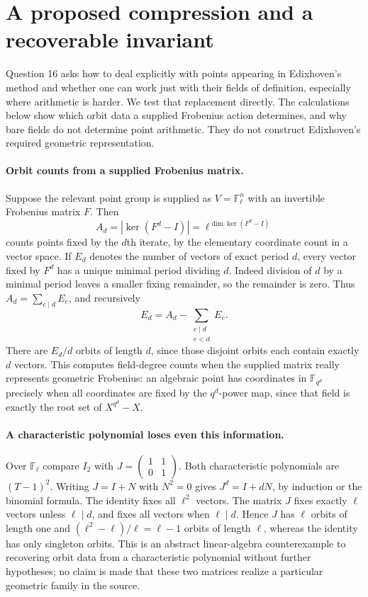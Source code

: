 \documentclass[11pt]{article}
\begin{document}
\section{A proposed compression and a recoverable invariant}
Question 16 asks how to deal explicitly with points appearing in
Edixhoven's method and whether one can work just with their fields
of definition, especially where arithmetic is harder. We test that
replacement directly. The calculations below show which orbit data
a supplied Frobenius action determines, and why bare fields do not
determine point arithmetic. They do not construct Edixhoven's required
geometric representation.

\paragraph{Orbit counts from a supplied Frobenius matrix.}
Suppose the relevant point group is supplied as
$V=\mathbb F_\ell^n$ with an invertible Frobenius matrix $F$.
Then
\[
A_d=|\ker(F^d-I)|=\ell^{\dim\ker(F^d-I)}
\]
counts points fixed by the $d$th iterate, by the elementary coordinate
count in a vector space. If $E_d$ denotes the number of vectors
of exact period $d$, every vector fixed by $F^d$ has a unique
minimal period dividing $d$. Indeed division of $d$ by a minimal
period leaves a smaller fixing remainder, so the remainder is zero.
Thus $A_d=\sum_{e\mid d}E_e$, and recursively
\[
E_d=A_d-\sum_{\substack{e\mid d\\e<d}}E_e.
\]
There are $E_d/d$ orbits of length $d$, since those disjoint orbits
each contain exactly $d$ vectors. This computes field-degree counts
when the supplied matrix really represents geometric Frobenius: an
algebraic point has coordinates in $\mathbb F_{q^d}$ precisely when
all coordinates are fixed by the $q^d$-power map, since that field
is exactly the root set of $X^{q^d}-X$.

\paragraph{A characteristic polynomial loses even this information.}
Over $\mathbb F_\ell$ compare $I_2$ with
$J=\left(\begin{smallmatrix}1&1\\0&1\end{smallmatrix}\right)$.
Both characteristic polynomials are $(T-1)^2$. Writing $J=I+N$
with $N^2=0$ gives $J^d=I+dN$, by induction or the binomial
formula. The identity fixes all $\ell^2$ vectors. The matrix $J$
fixes exactly $\ell$ vectors unless $\ell\mid d$, and fixes all
vectors when $\ell\mid d$. Hence $J$ has $\ell$ orbits of
length one and $(\ell^2-\ell)/\ell=\ell-1$ orbits of length
$\ell$, whereas the identity has only singleton orbits. This is
an abstract linear-algebra counterexample to recovering orbit data
from a characteristic polynomial without further hypotheses; no
claim is made that these two matrices realize a particular geometric
family in the source.
\end{document}

